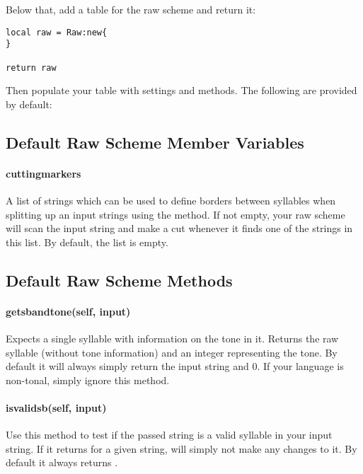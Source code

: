 \documentclass{ltxdockit}
\begin{document}
Below that, add a table for the raw scheme and return it:

\begin{lstlisting}
local raw = Raw:new{
}

return raw
\end{lstlisting}

Then populate your table with settings and methods. The following are provided
by default:

\subsection{Default Raw Scheme Member Variables}

\paragraph{cutting\textunderscore{}markers}

A list of strings which can be used to define borders between syllables when
splitting up an input strings using the  method.
If not empty, your raw scheme will scan the input string and make a cut whenever
it finds one of the strings in this list. By default, the list is empty.

\subsection{Default Raw Scheme Methods}

\paragraph{get\textunderscore{}sb\textunderscore{}and\textunderscore{}tone(self, input)}

Expects a single syllable with information on the tone in it. Returns the raw
syllable (without tone information) and an integer representing the tone. By
default it will always simply return the input string and 0. If your language is
non-tonal, simply ignore this method.

\paragraph{is\textunderscore{}valid\textunderscore{}sb(self, input)}

Use this method to test if the passed string is a valid syllable in your input
string. If it returns  for a given string, \transconv{} will
simply not make any changes to it. By default it always returns .
\end{document}
